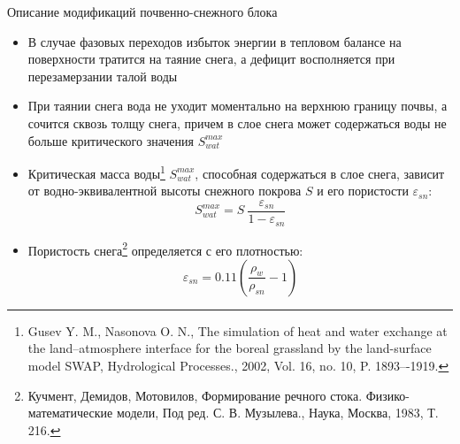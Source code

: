 \documentclass[unicode]{beamer}
\begin{document}
\begin{frame}{Описание модификаций почвенно-снежного блока}
    
\footnotesize

\begin{itemize}
    \item В случае фазовых переходов избыток энергии в тепловом балансе на поверхности тратится на таяние снега, а дефицит восполняется при перезамерзании талой воды
    \item При таянии снега вода не уходит моментально на верхнюю границу почвы, а сочится сквозь толщу снега, причем в слое снега может содержаться воды не больше критического значения $S_{wat}^{max}$
    \item Критическая масса воды\footnote{\tiny Gusev Y. M., Nasonova O. N., The simulation of heat and water exchange at the land–atmosphere interface for the boreal grassland by the land-surface model SWAP, Hydrological Processes., 2002, Vol. 16, no. 10, P. 1893–-1919.} $S_{wat}^{max}$, способная содержаться в слое снега, зависит от водно-эквивалентной высоты снежного покрова $S$ и его пористости $\varepsilon_{sn}$:
    \[ S_{wat}^{max} = S ~\dfrac{\varepsilon_{sn}}{1 - \varepsilon_{sn}} \]
    \item Пористость снега\footnote{\tiny Кучмент, Демидов, Мотовилов, Формирование речного стока. Физико-математические модели, Под ред. С. В. Музылева., Наука, Москва, 1983, Т. 216.} определяется с его плотностью:
    \[ \varepsilon_{sn} = 0.11 \left( \dfrac{\rho_w}{\rho_{sn}} - 1 \right) \]

\end{itemize}
    
\end{frame}
\end{document}
